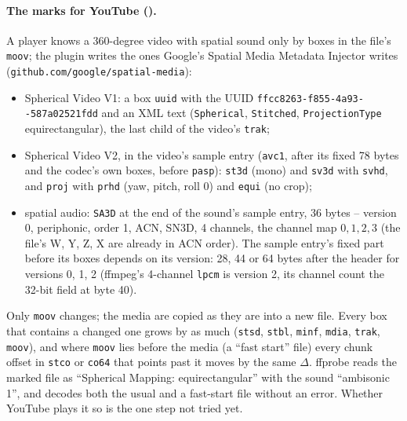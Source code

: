 \paragraph{The marks for YouTube ().} A player knows a 360-degree video with spatial sound only by
boxes in the file's \texttt{moov}; the plugin writes the ones Google's Spatial Media Metadata Injector writes
(\texttt{github.com/google/spatial-media}):
\begin{itemize}
  \item Spherical Video V1: a box \texttt{uuid} with the UUID
        \texttt{ffcc8263-f855-\allowbreak 4a93--\allowbreak 587a02521fdd} and an XML text (\texttt{Spherical}, \texttt{Stitched}, \texttt{ProjectionType} equirectangular), the last child of the
        video's \texttt{trak};
  \item Spherical Video V2, in the video's sample entry (\texttt{avc1}, after its fixed 78 bytes and the codec's own
        boxes, before \texttt{pasp}): \texttt{st3d} (mono) and \texttt{sv3d} with \texttt{svhd}, and \texttt{proj}
        with \texttt{prhd} (yaw, pitch, roll 0) and \texttt{equi} (no crop);
  \item spatial audio: \texttt{SA3D} at the end of the sound's sample entry, 36 bytes -- version 0, periphonic, order 1,
        ACN, SN3D, 4 channels, the channel map $0, 1, 2, 3$ (the file's W, Y, Z, X are already in ACN order). The
        sample entry's fixed part before its boxes depends on its version: 28, 44 or 64 bytes after the header for
        versions 0, 1, 2 (ffmpeg's 4-channel \texttt{lpcm} is version 2, its channel count the 32-bit field at
        byte 40).
\end{itemize}
Only \texttt{moov} changes; the media are copied as they are into a new file. Every box that contains a changed
one grows by as much (\texttt{stsd}, \texttt{stbl}, \texttt{minf}, \texttt{mdia}, \texttt{trak}, \texttt{moov}), and
where \texttt{moov} lies before the media (a \enquote{fast start} file) every chunk offset in \texttt{stco} or
\texttt{co64} that points past it moves by the same $\Delta$. ffprobe reads the marked file as
\enquote{Spherical Mapping: equirectangular} with the sound \enquote{ambisonic 1}, and decodes both the usual and a
fast-start file without an error. Whether YouTube plays it so is the one step not tried yet.
